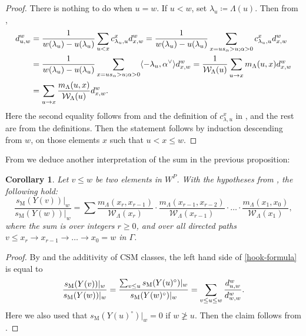 \documentclass[11pt]{article}
\newtheorem{corol}[theo]{Corollary}
\theoremstyle{definition}
\numberwithin{equation}{section}
\newcommand{\ssm}{s_{\mathrm{M}}}
\begin{document}
\begin{proof}
There is nothing to do when $u=w$. If $u<w$, set $\lambda_u\coloneqq  \Lambda(u)$. Then from
,
\[ \begin{split} d_{u,w}^w & = \frac{1}{w(\lambda_u) - u(\lambda_u)} \sum_{u < x} c_{\lambda_u, u}^x d_{x,w}^w
= \frac{1}{w(\lambda_u) - u(\lambda_u)} \sum_{x= us_\alpha >u ; \alpha >0} 
c_{\lambda_u, u}^x d_{x,w}^w
\\ & = \frac{1}{w(\lambda_u) - u(\lambda_u)} \sum_{x= us_\alpha >u ; \alpha >0} \langle -\lambda_u , \alpha^\vee \rangle  d_{x,w}^w = 
\frac{1}{\mathcal{W}_\Lambda(u)} \sum_{u \overset{}{\to} x } m_\Lambda(u,x) d_{x,w}^w \\ &
= \sum_{u \overset{}{\to} x } \frac{m_\Lambda(u,x)}{\mathcal{W}_\Lambda(u)} d_{x,w}^w \/. \end{split}
\] Here the second equality follows from  and the definition of $c_{\lambda, u}^x$ in , and the rest are from the definitions. Then the statement follows
by induction descending from $w$, on those elements $x$ such that $u<x\le w$.
\end{proof}
From  we deduce another interpretation of the sum in the previous proposition:
\begin{corol}\label{thm:LocCSM2} Let $v \le w$ be two elements in $W^P$. 
With the hypotheses from , the following hold:
\begin{equation}\label{hook-formula}
\frac{\ssm(Y(v))|_w}{\ssm(Y(w))|_w} =
\sum
\frac{m_\Lambda(x_r,x_{r-1})}{\mathcal{W}_\Lambda(x_r)}\cdot \frac{m_\Lambda(x_{r-1},x_{r-2})}{\mathcal{W}_\Lambda(x_{r-1})}\cdot \ldots \cdot \frac{m_\Lambda(x_{1},x_{0})}{\mathcal{W}_\Lambda(x_{1})},
\end{equation} where the sum is over integers $r \ge 0$, and over all directed paths 
$v\leq x_r \overset{}{\to} x_{r-1} \overset{}{\to} \ldots \overset{}{\to} x_0 = w$ in $\Gamma$.
\end{corol}
\begin{proof} By  and the additivity of CSM classes, 
the left hand side of \eqref{hook-formula} is equal to 
\[\displaystyle \frac{\ssm(Y(v))|_w}{\ssm(Y(w))|_w}=\frac{\sum_{v\leq u}\ssm(Y(u)^\circ)|_w}{\ssm(Y(w)^\circ)|_w} =\sum_{v\leq u\leq w} \frac{d_{u,w}^{w}}{d_{w,w}^{w}}
\/.
\] 
Here we also used that $\ssm(Y(u)^\circ)|_w=0$ if $w \ngeq u$.
Then the claim follows from .\end{proof}
\end{document}
